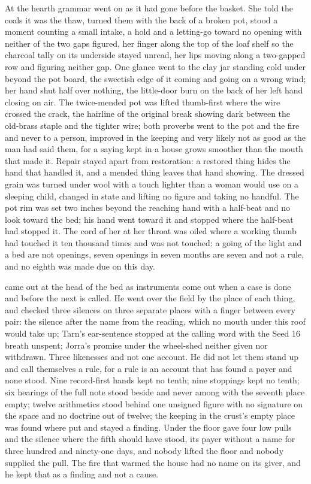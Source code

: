 At  the hearth grammar went on as it had gone before the basket. She told the coals it was the thaw, turned them with the back of a broken pot, stood a moment counting a small intake, a hold and a letting-go toward no opening with neither of the two gaps figured, her finger along the top of the loaf shelf so the charcoal tally on its underside stayed unread, her lips moving along a two-gapped row and figuring neither gap. One glance went to the clay jar standing cold under  beyond the pot board, the sweetish edge of it coming and going on a wrong wind; her hand shut half over nothing, the little-door burn on the back of her left hand closing on air. The twice-mended pot was lifted thumb-first where the wire crossed the crack, the hairline of the original break showing dark between the old-brass staple and the tighter wire; both proverbs went to the pot and the fire and never to a person, improved in the keeping and very likely not as good as the man had said them, for a saying kept in a house grows smoother than the mouth that made it. Repair stayed apart from restoration: a restored thing hides the hand that handled it, and a mended thing leaves that hand showing. The dressed grain was turned under wool with a touch lighter than a woman would use on a sleeping child, changed in state and lifting no figure and taking no handful. The pot rim was set two inches beyond the reaching hand with a half-beat and no look toward the bed; his hand went toward it and stopped where the half-beat had stopped it. The cord of her  at her throat was oiled where a working thumb had touched it ten thousand times and was not touched: a going of the light and a bed are not openings, seven openings in seven months are seven and not a rule, and no eighth was made due on this day.

 came out at the head of the bed as instruments come out when a case is done and before the next is called. He went over the field by the place of each thing, and checked three silences on three separate places with a finger between every pair: the silence after the name from the reading, which no mouth under this roof would take up; Tarn's ear-sentence stopped at the calling word with the Seed 16 breath unspent; Jorra's promise under the wheel-shed neither given nor withdrawn. Three likenesses and not one account. He did not let them stand up and call themselves a rule, for a rule is an account that has found a payer and none stood. Nine record-first hands kept no tenth; nine stoppings kept no tenth; six hearings of the full note stood beside and never among with the seventh place empty; twelve arithmetics stood behind one unsigned figure with no signature on the space and no doctrine out of twelve; the keeping in the crust's empty place was found where put and stayed a finding. Under the floor  gave four low pulls and the silence where the fifth should have stood, its payer without a name for three hundred and ninety-one days, and nobody lifted the floor and nobody supplied the pull. The fire that warmed the house had no name on its giver, and he kept that as a finding and not a cause.

